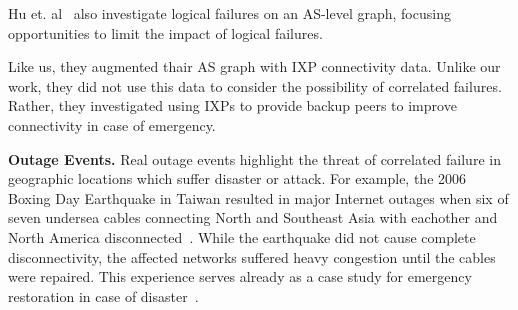     Hu et. al~\cite{ixp-routingdiversity} also investigate logical failures on
    an AS-level graph, focusing opportunities to limit the impact of logical
    failures.

    Like us, they augmented thair AS graph with IXP connectivity data.  Unlike
    our work, they did not use this data to consider the possibility of
    correlated failures.  Rather, they investigated using IXPs to provide backup
    peers to improve connectivity in case of emergency.

{\bf Outage Events.}  Real outage events highlight the threat of correlated
    failure in geographic locations which suffer disaster or attack.  For
    example, the 2006 Boxing Day Earthquake in Taiwan resulted in major Internet
    outages when six of seven undersea cables connecting North and Southeast
    Asia with eachother and North America disconnected~\cite{asia-comm-quake}.
    While the earthquake did not cause complete disconnectivity, the affected
    networks suffered heavy congestion until the cables were repaired.  This
    experience serves already as a case study for emergency restoration in case
    of disaster~\cite{taiwan}.
        



